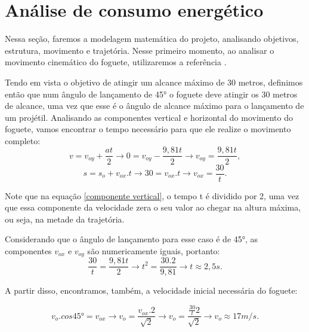  \section{Análise de consumo energético}

Nessa seção, faremos a modelagem matemática do projeto, analisando objetivos, estrutura, movimento e trajetória. Nesse primeiro momento, ao analisar o movimento cinemático do foguete, utilizaremos a referência \cite{moyses}.

 Tendo em vista o objetivo de atingir um alcance máximo de 30 metros, definimos então que num ângulo de lançamento de 45° o foguete deve atingir os 30 metros de alcance, uma vez que esse é o ângulo de alcance máximo para o lançamento de um projétil.  Analisando as componentes vertical e horizontal do movimento do foguete, vamos encontrar o tempo necessário para que ele realize o movimento completo:
\begin{equation}
    v=v_{oy}+\frac{at}{2} \xrightarrow{} 0=v_{oy}-\frac{9,81t}{2}\xrightarrow{}v_{oy}=\frac{9,81t}{2},
    \label{componente vertical}
\end{equation}
\begin{equation}
    s=s_o+v_{ox}.t \xrightarrow{} 30=v_{ox}.t \xrightarrow{} v_{ox}=\frac{30}{t}.
    \label{componente horizontal}
\end{equation}

Note que na equação \ref{componente vertical}, o tempo t é dividido por 2, uma vez que essa componente da velocidade zera o seu valor ao chegar na altura máxima, ou seja, na metade da trajetória.

Considerando que o ângulo de lançamento para esse caso é de 45°, as componentes \(v_{ox}\) e \(v_{oy}\) são numericamente iguais, portanto:
\begin{equation}
    \frac{30}{t}=\frac{9,81t}{2} \xrightarrow{} t^2=\frac{30.2}{9,81} \xrightarrow{} t \approx 2,5s.
    \label{tempo t}
\end{equation}

A partir disso, encontramos, também, a velocidade inicial necessária do foguete:

\begin{equation}
     v_o.cos 45°=v_{ox} \xrightarrow{} v_o= \frac{v_{ox}.2}{\sqrt{2}}\xrightarrow{} v_o=\frac{\frac{30}{t}2}{\sqrt{2}} \xrightarrow{} v_o \approx 17 m/s.
     \label{vo}
\end{equation}

